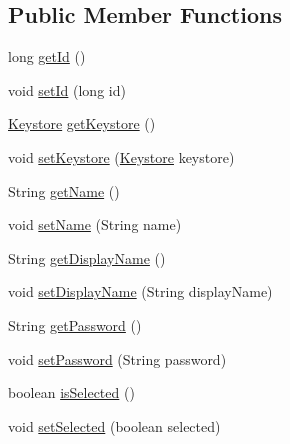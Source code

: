 \subsection*{Public Member Functions}
\begin{DoxyCompactItemize}
\item 
long \hyperlink{classorg_1_1buildmlearn_1_1toolkit_1_1utilities_1_1Alias_ad854360fe849540917362f3fda65b118}{get\-Id} ()
\item 
void \hyperlink{classorg_1_1buildmlearn_1_1toolkit_1_1utilities_1_1Alias_a46050f92ad4ea5360c50aa865c177ff1}{set\-Id} (long id)
\item 
\hyperlink{classorg_1_1buildmlearn_1_1toolkit_1_1utilities_1_1Keystore}{Keystore} \hyperlink{classorg_1_1buildmlearn_1_1toolkit_1_1utilities_1_1Alias_ae6fd9833900335696443e219d50e900e}{get\-Keystore} ()
\item 
void \hyperlink{classorg_1_1buildmlearn_1_1toolkit_1_1utilities_1_1Alias_a1b6a7ec467e6a3a20794086af1f34057}{set\-Keystore} (\hyperlink{classorg_1_1buildmlearn_1_1toolkit_1_1utilities_1_1Keystore}{Keystore} keystore)
\item 
String \hyperlink{classorg_1_1buildmlearn_1_1toolkit_1_1utilities_1_1Alias_a0bb609953ae521ac184a0cf3ed347703}{get\-Name} ()
\item 
void \hyperlink{classorg_1_1buildmlearn_1_1toolkit_1_1utilities_1_1Alias_a78e04df1f7e80d248a219d89c91a6034}{set\-Name} (String name)
\item 
String \hyperlink{classorg_1_1buildmlearn_1_1toolkit_1_1utilities_1_1Alias_adc60c0bcd710831f5a9281c3ef884d0d}{get\-Display\-Name} ()
\item 
void \hyperlink{classorg_1_1buildmlearn_1_1toolkit_1_1utilities_1_1Alias_a3b06eeb819f1640f253022a44fa925cc}{set\-Display\-Name} (String display\-Name)
\item 
String \hyperlink{classorg_1_1buildmlearn_1_1toolkit_1_1utilities_1_1Alias_aa19ddc355d3eac8fa1317b6ebe66fe30}{get\-Password} ()
\item 
void \hyperlink{classorg_1_1buildmlearn_1_1toolkit_1_1utilities_1_1Alias_a00ba075722c71303485f0991413f659b}{set\-Password} (String password)
\item 
boolean \hyperlink{classorg_1_1buildmlearn_1_1toolkit_1_1utilities_1_1Alias_a0b7267664c59b5c2ebd7eaa300270bc6}{is\-Selected} ()
\item 
void \hyperlink{classorg_1_1buildmlearn_1_1toolkit_1_1utilities_1_1Alias_a31f1875c4a77412a7d9207f285aea841}{set\-Selected} (boolean selected)
\item 

\end{DoxyCompactItemize}
